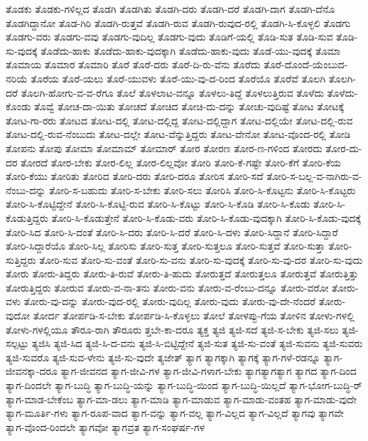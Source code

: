 {ತೊಡಕು
ತೊಡಕು-ಗಳಿಲ್ಲದ
ತೊಡಗಿ
ತೊಡಗಿತು
ತೊಡಗಿ-ದರು
ತೊಡಗಿ-ದರೆ
ತೊಡಗಿ-ದಾಗ
ತೊಡಗಿ-ದೆನೊ
ತೊಡಗಿದ್ದಾನೋ
ತೊಡ-ಗಿರಿ
ತೊಡಗಿ-ರುತ್ತವೆ
ತೊಡಗಿ-ರುವ
ತೊಡಗಿ-ರುವುದ-ರಲ್ಲಿ
ತೊಡಗಿ-ಸಿ-ಕೊಳ್ಳಲಿ
ತೊಡಗು
ತೊಡಗು-ವರು
ತೊಡಗು-ವವು
ತೊಡಗು-ವುದಿಲ್ಲ
ತೊಡಗು-ವುದು
ತೊಡಿಗೆ-ಯಲ್ಲಿ
ತೊಡಿ-ಸುತ
ತೊಡಿ-ಸುವ
ತೊಡಿ-ಸು-ವುದಕ್ಕೆ
ತೊಡೆದು-ಹಾಕು
ತೊಡೆದು-ಹಾಕು-ವುದಕ್ಕಾಗಿ
ತೊಡೆದು-ಹಾಕು-ವುದು
ತೊಡೆ-ಯು-ವುದಕ್ಕೆ
ತೊಮಾ
ತೊಮಾಯ
ತೊಮಾರ
ತೊಮಾರಿ
ತೊರೆ
ತೊರೆ-ದರು
ತೊರೆ-ದಿ-ರು-ವೆನು
ತೊರೆದು
ತೊರೆ-ದೊಂದೆ-ಯೆಂಬುದ-ನರಿಯೆ
ತೊರೆಯ
ತೊರೆ-ಯಲು
ತೊರೆ-ಯುವಳು
ತೊರೆ-ಯು-ವು-ದ-ರಿಂದ
ತೊರೆಯೊ
ತೊರೆವೆ
ತೊಲಗಿ
ತೊಲಗಿ-ದರೆ
ತೊಲಗಿ-ಹೋಗು-ವ-ವ-ರೆಗೂ
ತೊಲೆ
ತೊಳಲಾಟ-ವನ್ನೂ
ತೊಳಲು-ತಿದ್ದೆ
ತೊಳಲುತ್ತಿರುವ
ತೊಳೆದು
ತೊಳೆದು-ಕೊಂಡು
ತೊವ್ವೆ
ತೋಚ-ದಾ-ಯಿತು
ತೋಚದೆ
ತೋಚಿದ
ತೋಚಿ-ದು-ದನ್ನು
ತೋಚು-ವುದಿಷ್ಟೆ
ತೋಟ
ತೋಟಕ್ಕೆ
ತೋಟ-ಗಾ-ರರು
ತೋಟದ
ತೋಟ-ದಲ್ಲಿ
ತೋಟ-ದಲ್ಲಿದ್ದ
ತೋಟ-ದಲ್ಲಿದ್ದಾಗ
ತೋಟ-ದಲ್ಲಿಯೇ
ತೋಟ-ದಲ್ಲಿ-ರುವ
ತೋಟ-ದಲ್ಲಿ-ರುವ-ನೆಂಬುದು
ತೋಟ-ದಲ್ಲೇ
ತೋಟ-ವೆನ್ನುತ್ತಿದ್ದರು
ತೋಟ-ವೇನೋ
ತೋಟ-ವೊಂದ-ರಲ್ಲಿ
ತೋಡಿ
ತೋಪನು
ತೋಪು
ತೋಮಾ
ತೋಮಾಮ್
ತೋಮಾರ್
ತೋರ
ತೋರಣ
ತೋರ-ಣ-ಗಳಿಂದ
ತೋರದು
ತೋರ-ದು-ದರ
ತೋರದೆ
ತೋರ-ಬೇಕು
ತೋರ-ಲಿಲ್ಲ
ತೋರ-ಲಿಲ್ಲವೋ
ತೋರಿ
ತೋರಿ-ಕೆ-ಗಷ್ಟೇ
ತೋರಿ-ಕೆಗೆ
ತೋರಿ-ಕೆಯ
ತೋರಿ-ಕೆಯು
ತೋರಿತು
ತೋರಿದ
ತೋರಿ-ದರು
ತೋರಿ-ದರೂ
ತೋರಿಸ
ತೋರಿ-ಸದೆ
ತೋರಿ-ಸ-ಬಲ್ಲ-ವ-ನಾಗಿರು-ವ-ನೆಂಬು-ದನ್ನು
ತೋರಿ-ಸ-ಬಹುದು
ತೋರಿ-ಸ-ಬೇಕು
ತೋರಿ-ಸಲು
ತೋರಿಸಿ
ತೋರಿ-ಸಿ-ಕೊಟ್ಟನು
ತೋರಿ-ಸಿ-ಕೊಟ್ಟರು
ತೋರಿ-ಸಿ-ಕೊಟ್ಟಿದ್ದೇನೆ
ತೋರಿ-ಸಿ-ಕೊಟ್ಟಿ-ರುವ
ತೋರಿ-ಸಿ-ಕೊಟ್ಟು
ತೋರಿ-ಸಿ-ಕೊಡಿ
ತೋರಿ-ಸಿ-ಕೊಡು
ತೋರಿ-ಸಿ-ಕೊಡುತ್ತಿದ್ದರು
ತೋರಿ-ಸಿ-ಕೊಡುತ್ತೇನೆ
ತೋರಿ-ಸಿ-ಕೊಡು-ವರು
ತೋರಿ-ಸಿ-ಕೊಡು-ವುದಕ್ಕಾಗಿ
ತೋರಿ-ಸಿ-ಕೊಡು-ವುದಕ್ಕೆ
ತೋರಿ-ಸಿದ
ತೋರಿ-ಸಿ-ದಂತೆ
ತೋರಿ-ಸಿ-ದರು
ತೋರಿ-ಸಿ-ದರೆ
ತೋರಿ-ಸಿ-ದಳು
ತೋರಿ-ಸಿದ್ದಾನೆ
ತೋರಿ-ಸಿದ್ದಾರೆ
ತೋರಿ-ಸಿದ್ದಾರೆಯೊ
ತೋರಿ-ಸಿಲ್ಲ
ತೋರಿಸು
ತೋರಿ-ಸುತ್ತ
ತೋರಿ-ಸುತ್ತಲೂ
ತೋರಿ-ಸುತ್ತವೆ
ತೋರಿ-ಸುತ್ತಾ
ತೋರಿ-ಸುತ್ತಿದ್ದರು
ತೋರಿ-ಸುವ
ತೋರಿ-ಸು-ವಂತೆ
ತೋರಿ-ಸು-ವನು
ತೋರಿ-ಸು-ವುದಕ್ಕೆ
ತೋರಿ-ಸು-ವು-ದರ
ತೋರಿ-ಸು-ವುದು
ತೋರು
ತೋರು-ತಿದ್ದರು
ತೋರು-ತಿ-ರುವೆ
ತೋರು-ತಿ-ಹುದು
ತೋರುತ್ತದೆ
ತೋರುತ್ತಲೂ
ತೋರುತ್ತವೆ
ತೋರುತ್ತಿತ್ತು
ತೋರುತ್ತಿದ್ದರು
ತೋರುವ
ತೋರು-ವ-ನಾ-ತನು
ತೋರು-ವನು
ತೋರು-ವ-ರೆಂಬು-ದನ್ನೂ
ತೋರು-ವರೋ
ತೋರು-ವಳು
ತೋರು-ವು-ದನ್ನು
ತೋರು-ವುದ-ರಲ್ಲಿ
ತೋರು-ವುದಿಲ್ಲ
ತೋರು-ವುದು
ತೋರು-ವು-ದೇ-ನೆಂದರೆ
ತೋರು-ವುದೋ
ತೋರ್ದ
ತೋರ್ಪಡಿ-ಸ-ಬೇಕು
ತೋರ್ಪಡಿ-ಸಿ-ಕೊಳ್ಳಲು
ತೋಲೆ
ತೋಳಪ್ಪು-ಗೆಯ
ತೋಳಿನ
ತೋಳು-ಗಳಲ್ಲಿ
ತೋಳು-ಗಳಲ್ಲಿಯೂ
ತೌರೂ-ರಾಗಿ
ತೌರೂರು
ತ್ತಬೇ-ಕಾ-ದರೂ
ತ್ಯಕ್ತ
ತ್ಯಜಿ
ತ್ಯಜಿ-ಸದೆ
ತ್ಯಜಿ-ಸ-ಬೇಕು
ತ್ಯಜಿ-ಸಲು
ತ್ಯಜಿ-ಸಲ್ಪಟ್ಟು
ತ್ಯಜಿಸಿ
ತ್ಯಜಿ-ಸಿದ
ತ್ಯಜಿ-ಸಿ-ದ-ವನು
ತ್ಯಜಿ-ಸಿ-ಬಿಟ್ಟಿದ್ದೇನೆ
ತ್ಯಜಿ-ಸುತ
ತ್ಯಜಿ-ಸು-ವಂತೆ
ತ್ಯಜಿ-ಸುವನು
ತ್ಯಜಿ-ಸುವರು
ತ್ಯಜಿ-ಸುವರೊ
ತ್ಯಜಿ-ಸುವ-ಳೇನು
ತ್ಯಜಿ-ಸು-ವುದೇ
ತ್ಯಜೇತ್
ತ್ಯಾಗ
ತ್ಯಾಗಕ್ಕಾಗಿ
ತ್ಯಾಗಕ್ಕೆ
ತ್ಯಾಗ-ಗಳೆ-ರಡನ್ನೂ
ತ್ಯಾಗ-ಜೀವನಕ್ಕಾ-ದರೂ
ತ್ಯಾಗ-ಜೀವನದ
ತ್ಯಾಗ-ಜೀವಿ-ಗಳ
ತ್ಯಾಗ-ಜೀವಿ-ಗಳಾಗ-ಬೇಕು
ತ್ಯಾಗತ್ಯಾಗತ್ಯಾಗ
ತ್ಯಾಗದ
ತ್ಯಾಗ-ದಿಂದ
ತ್ಯಾಗ-ದಿಂದಲೇ
ತ್ಯಾಗ-ಬುದ್ಧಿ
ತ್ಯಾಗ-ಬುದ್ಧಿ-ಯನ್ನು
ತ್ಯಾಗ-ಬುದ್ಧಿ-ಯಿಂದ
ತ್ಯಾಗ-ಬುದ್ಧಿ-ಯಿಲ್ಲದೆ
ತ್ಯಾಗ-ಭೋಗ-ಬುದ್ಧಿ-ರ್
ತ್ಯಾಗ-ಮಾಡ-ಬೇಕೆಂಬ
ತ್ಯಾಗ-ಮಾ-ಡಲು
ತ್ಯಾಗ-ಮಾಡಿ
ತ್ಯಾಗ-ಮಾಡುವ
ತ್ಯಾಗ-ಮಾಡು-ವಂತಹ
ತ್ಯಾಗ-ಮಾಡು-ವುದೇ
ತ್ಯಾಗ-ಮೂರ್ತಿ-ಗಳು
ತ್ಯಾಗ-ರೂಪ-ವಾದ
ತ್ಯಾಗ-ವನ್ನು
ತ್ಯಾಗ-ವಲ್ಲ
ತ್ಯಾಗ-ವಿಲ್ಲದ
ತ್ಯಾಗ-ವಿಲ್ಲದೆ
ತ್ಯಾಗವು
ತ್ಯಾಗವೇ
ತ್ಯಾಗ-ವೊಂದ-ರಿಂದಲೇ
ತ್ಯಾಗವೋ
ತ್ಯಾಗವ್ರತ
ತ್ಯಾಗ-ಸಂಘರ್ಷ-ಗಳ
}
